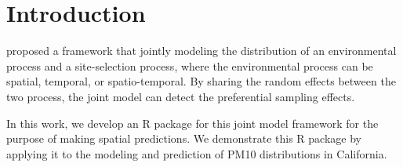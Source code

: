 \section{Introduction}
\cite{Watson2019_pref_samp} proposed a framework that jointly modeling the distribution of an
environmental process and a site-selection process, where the environmental process can be spatial,
temporal, or spatio-temporal. By sharing the random effects between the two process, the joint
model can detect the preferential sampling effects.

In this work, we develop an R package for this joint model framework for the purpose of making
spatial predictions. We demonstrate this R package by applying it to the modeling and prediction of
PM10 distributions in California. 